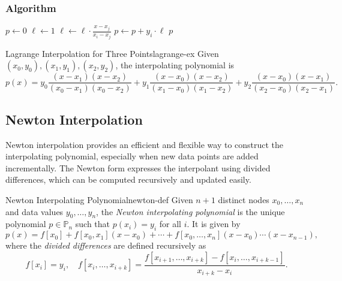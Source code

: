 \subsubsection{Algorithm}
\begin{algorithm}[H]
    \caption{Lagrange Interpolation}
    \begin{algorithmic}[1]
        \State \(p \gets 0\)
        \State \(\ell \gets 1\)
        \State \(\ell \gets \ell \cdot \frac{x - x_j}{x_i - x_j}\)
        \EndIf
        \EndFor
        \State \(p \gets p + y_i \cdot \ell\)
        \EndFor
        \State \Return \(p\)
    \end{algorithmic}
\end{algorithm}


\begin{example}{Lagrange Interpolation for Three Points}{lagrange-ex}
    Given \((x_0, y_0), (x_1, y_1), (x_2, y_2)\), the interpolating polynomial is
    \[
        p(x) = y_0 \frac{(x-x_1)(x-x_2)}{(x_0-x_1)(x_0-x_2)} + y_1 \frac{(x-x_0)(x-x_2)}{(x_1-x_0)(x_1-x_2)} + y_2 \frac{(x-x_0)(x-x_1)}{(x_2-x_0)(x_2-x_1)}.
    \]
\end{example}


\subsection{Newton Interpolation}
Newton interpolation provides an efficient and flexible way to construct the interpolating polynomial, especially when new data points are added incrementally. The Newton form expresses the interpolant using divided differences, which can be computed recursively and updated easily.

\begin{definition}{Newton Interpolating Polynomial}{newton-def}
    Given \(n+1\) distinct nodes \(x_0, \ldots, x_n\) and data values \(y_0, \ldots, y_n\), the \emph{Newton interpolating polynomial} is the unique polynomial \(p \in \mathbb{P}_n\) such that \(p(x_i) = y_i\) for all \(i\). It is given by
    \[
        p(x) = f[x_0] + f[x_0, x_1](x-x_0) + \cdots + f[x_0, \ldots, x_n](x-x_0)\cdots(x-x_{n-1}),
    \]
    where the \emph{divided differences} are defined recursively as
    \[
        f[x_i] = y_i, \quad f[x_i, \ldots, x_{i+k}] = \frac{f[x_{i+1}, \ldots, x_{i+k}] - f[x_i, \ldots, x_{i+k-1}]}{x_{i+k} - x_i}.
    \]
\end{definition}

